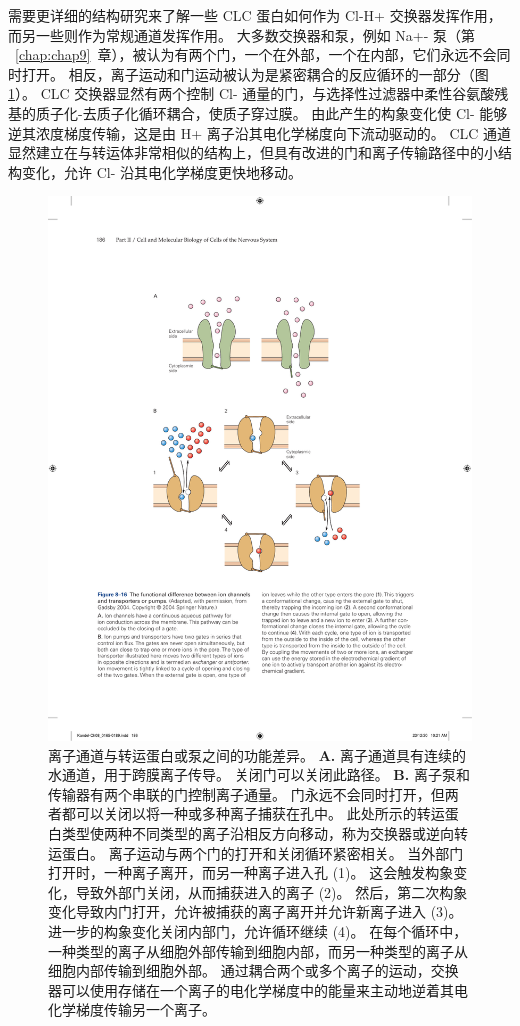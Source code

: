 需要更详细的结构研究来了解一些 CLC 蛋白如何作为 Cl-H+ 交换器发挥作用，而另一些则作为常规通道发挥作用。
大多数交换器和泵，例如 Na+- 泵（第 ~\ref{chap:chap9}~章），被认为有两个门，一个在外部，一个在内部，它们永远不会同时打开。
相反，离子运动和门运动被认为是紧密耦合的反应循环的一部分（图\ref{fig:8_16}）。
CLC 交换器显然有两个控制 Cl- 通量的门，与选择性过滤器中柔性谷氨酸残基的质子化-去质子化循环耦合，使质子穿过膜。
由此产生的构象变化使 Cl- 能够逆其浓度梯度传输，这是由 H+ 离子沿其电化学梯度向下流动驱动的。
CLC 通道显然建立在与转运体非常相似的结构上，但具有改进的门和离子传输路径中的小结构变化，允许 Cl- 沿其电化学梯度更快地移动。


\begin{figure}[htbp]
	\centering
	\includegraphics[width=0.6\linewidth]{chap08/fig_8_16}
	\caption{离子通道与转运蛋白或泵之间的功能差异\cite{gadsby2004spot}。 
		\textbf{A.} 离子通道具有连续的水通道，用于跨膜离子传导。
		关闭门可以关闭此路径。
		\textbf{B.} 离子泵和传输器有两个串联的门控制离子通量。
		门永远不会同时打开，但两者都可以关闭以将一种或多种离子捕获在孔中。
		此处所示的转运蛋白类型使两种不同类型的离子沿相反方向移动，称为交换器或逆向转运蛋白。
		离子运动与两个门的打开和关闭循环紧密相关。
		当外部门打开时，一种离子离开，而另一种离子进入孔 (1)。
		这会触发构象变化，导致外部门关闭，从而捕获进入的离子 (2)。
		然后，第二次构象变化导致内门打开，允许被捕获的离子离开并允许新离子进入 (3)。
		进一步的构象变化关闭内部门，允许循环继续 (4)。
		在每个循环中，一种类型的离子从细胞外部传输到细胞内部，而另一种类型的离子从细胞内部传输到细胞外部。
		通过耦合两个或多个离子的运动，交换器可以使用存储在一个离子的电化学梯度中的能量来主动地逆着其电化学梯度传输另一个离子。}
	\label{fig:8_16}
\end{figure}



